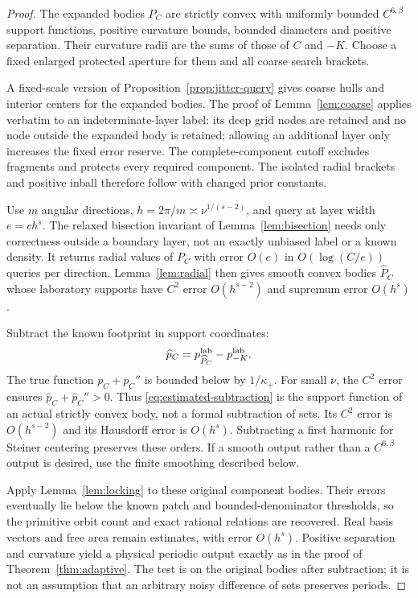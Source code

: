\begin{proof}
The expanded bodies $P_C$ are strictly convex with uniformly bounded
$C^{6,\beta}$ support functions, positive curvature bounds, bounded
diameters and positive separation. Their curvature radii are the sums
of those of $C$ and $-K$. Choose a fixed enlarged protected aperture
for them and all coarse search brackets.

A fixed-scale version of Proposition~\ref{prop:jitter-query} gives
coarse hulls and interior centers for the expanded bodies. The proof of
Lemma~\ref{lem:coarse} applies verbatim to an indeterminate-layer label:
its deep grid nodes are retained and no node outside the expanded body
is retained; allowing an additional layer only increases the fixed
error reserve. The complete-component cutoff excludes fragments and
protects every required component. The isolated radial brackets and
positive inball therefore follow with changed prior constants.

Use $m$ angular directions, $h=2\pi/m\asymp\nu^{1/(s-2)}$, and
query at layer width $e=c h^s$. The relaxed bisection invariant of
Lemma~\ref{lem:bisection} needs only correctness outside a boundary
layer, not an exactly unbiased label or a known density. It returns
radial values of $P_C$ with error $O(e)$ in $O(\log(C/e))$ queries
per direction. Lemma~\ref{lem:radial} then gives smooth convex bodies
$\widehat P_C$ whose laboratory supports have $C^2$ error $O(h^{s-2})$
and supremum error $O(h^s)$.

Subtract the known footprint in support coordinates:
\begin{equation}\label{eq:estimated-subtraction}
                 \widehat p_C= p_{\widehat P_C}^{\rm lab}-p_{-K}^{\rm lab}.
\end{equation}
The true function $p_C+p_C''$ is bounded below by $1/\kappa_+$.
For small $\nu$, the $C^2$ error ensures
$\widehat p_C+\widehat p_C''>0$. Thus \eqref{eq:estimated-subtraction}
is the support function of an actual strictly convex body, not a formal
subtraction of sets. Its $C^2$ error is $O(h^{s-2})$ and its Hausdorff
error is $O(h^s)$. Subtracting a first harmonic for Steiner centering
preserves these orders. If a smooth output rather than a $C^{6,\beta}$
output is desired, use the finite smoothing described below.

Apply Lemma~\ref{lem:locking} to these original component bodies.
Their errors eventually lie below the known patch and bounded-denominator
thresholds, so the primitive orbit count and exact rational relations
are recovered. Real basis vectors and free area remain estimates, with
error $O(h^s)$. Positive separation and curvature yield a physical
periodic output exactly as in the proof of Theorem~\ref{thm:adaptive}.
The test is on the original bodies after subtraction; it is not an
assumption that an arbitrary noisy difference of sets preserves periods.


\end{proof}
